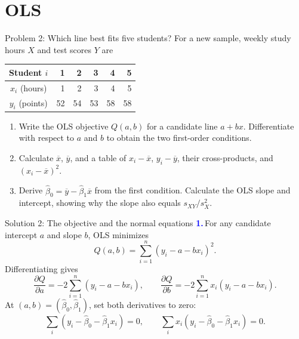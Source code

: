 \documentclass[notes,10pt, aspectratio=169]{beamer}
\newif\ifshowsolutions
\newcommand{\answerpart}[1]{\textcolor{blue}{\textbf{#1.}}\,}
\begin{document}
\section{OLS}

\begin{frame}{Problem 2: Which line best fits five students?}
For a new sample, weekly study hours $X$ and test scores $Y$ are
\begin{center}
\begin{tabular}{c|rrrrr}
Student $i$ & 1 & 2 & 3 & 4 & 5 \\ \hline
$x_i$ (hours) & 1 & 2 & 3 & 4 & 5 \\
$y_i$ (points) & 52 & 54 & 53 & 58 & 58
\end{tabular}
\end{center}
\begin{enumerate}
\setlength{\itemsep}{8pt}
\item Write the OLS objective $Q(a,b)$ for a candidate line $a+bx$. Differentiate with respect to $a$ and $b$ to obtain the two first-order conditions.
\item Calculate $\overline x$, $\overline y$, and a table of $x_i-\overline x$, $y_i-\overline y$, their cross-products, and $(x_i-\overline x)^2$.
\item Derive $\widehat\beta_0=\overline y-\widehat\beta_1\overline x$ from the first condition. Calculate the OLS slope and intercept, showing why the slope also equals $s_{XY}/s_X^2$.
\end{enumerate}
\end{frame}

\ifshowsolutions
\begin{frame}{Solution 2: The objective and the normal equations}
\small
\answerpart{1}For any candidate intercept $a$ and slope $b$, OLS minimizes
\[
Q(a,b)=\sum_{i=1}^n(y_i-a-bx_i)^2.
\]
Differentiating gives
\[
\frac{\partial Q}{\partial a}=-2\sum_{i=1}^n(y_i-a-bx_i),
\qquad
\frac{\partial Q}{\partial b}=-2\sum_{i=1}^n x_i(y_i-a-bx_i).
\]
At $(a,b)=(\widehat\beta_0,\widehat\beta_1)$, set both derivatives to zero:
\[
\sum_i(y_i-\widehat\beta_0-\widehat\beta_1x_i)=0,
\qquad
\sum_i x_i(y_i-\widehat\beta_0-\widehat\beta_1x_i)=0.
\]
\end{frame}
\end{document}
